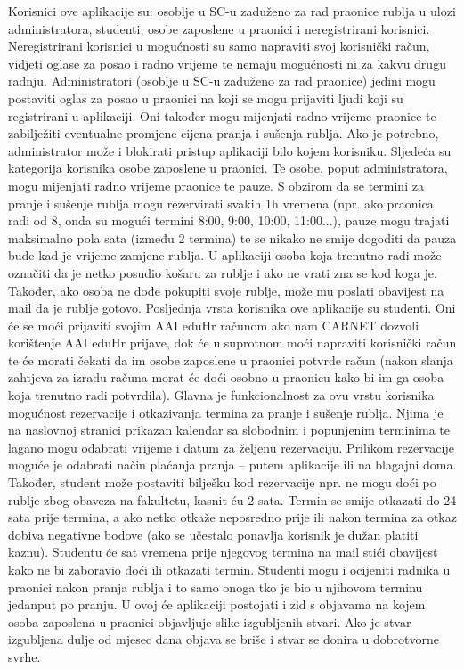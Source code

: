 			{Korisnici ove aplikacije su: osoblje u SC-u zaduženo za rad praonice rublja u ulozi administratora,
			studenti, osobe zaposlene u praonici i neregistrirani korisnici.
			Neregistrirani korisnici u mogućnosti su samo napraviti svoj korisnički račun, vidjeti oglase za posao i
			radno vrijeme te nemaju mogućnosti ni za kakvu drugu radnju.
			Administratori (osoblje u SC-u zaduženo za rad praonice) jedini mogu postaviti oglas za posao u praonici
			na koji se mogu prijaviti ljudi koji su registrirani u aplikaciji. Oni također mogu mijenjati radno vrijeme
			praonice te zabilježiti eventualne promjene cijena pranja i sušenja rublja. Ako je potrebno,
			administrator može i blokirati pristup aplikaciji bilo kojem korisniku.
			Sljedeća su kategorija korisnika osobe zaposlene u praonici. Te osobe, poput administratora, mogu
			mijenjati radno vrijeme praonice te pauze. S obzirom da se termini za pranje i sušenje rublja mogu
			rezervirati svakih 1h vremena (npr. ako praonica radi od 8, onda su mogući termini 8:00, 9:00, 10:00,
			11:00...), pauze mogu trajati maksimalno pola sata (između 2 termina) te se nikako ne smije dogoditi da
			pauza bude kad je vrijeme zamjene rublja. U aplikaciji osoba koja trenutno radi može označiti da je netko
			posudio košaru za rublje i ako ne vrati zna se kod koga je. Također, ako osoba ne dođe pokupiti svoje rublje,
			može mu poslati obavijest na mail da je rublje gotovo.
			Posljednja vrsta korisnika ove aplikacije su studenti. Oni će se moći prijaviti svojim AAI eduHr računom
			ako nam CARNET dozvoli korištenje AAI eduHr prijave, dok će u suprotnom moći napraviti korisnički
			račun te će morati čekati da im osobe zaposlene u praonici potvrde račun (nakon slanja zahtjeva za
			izradu računa morat će doći osobno u praonicu kako bi im ga osoba koja trenutno radi potvrdila).
			Glavna je funkcionalnost za ovu vrstu korisnika mogućnost rezervacije i otkazivanja termina za pranje i
			sušenje rublja. Njima je na naslovnoj stranici prikazan kalendar sa slobodnim i popunjenim terminima te
			lagano mogu odabrati vrijeme i datum za željenu rezervaciju. Prilikom rezervacije moguće je odabrati
			način plaćanja pranja – putem aplikacije ili na blagajni doma. Također, student može postaviti bilješku
			kod rezervacije npr. ne mogu doći po rublje zbog obaveza na fakultetu, kasnit ću 2 sata. Termin se smije
			otkazati do 24 sata prije termina, a ako netko otkaže neposredno prije ili nakon termina za otkaz dobiva
			negativne bodove (ako se učestalo ponavlja korisnik je dužan platiti kaznu). Studentu će sat vremena
			prije njegovog termina na mail stići obavijest kako ne bi zaboravio doći ili otkazati termin.
			Studenti mogu i ocijeniti radnika u praonici nakon pranja rublja i to samo onoga tko je bio u njihovom
			terminu jedanput po pranju.
			U ovoj će aplikaciji postojati i zid s objavama na kojem osoba zaposlena u praonici objavljuje slike
			izgubljenih stvari. Ako je stvar izgubljena dulje od mjesec dana objava se briše i stvar se donira u
			dobrotvorne svrhe. }
		
